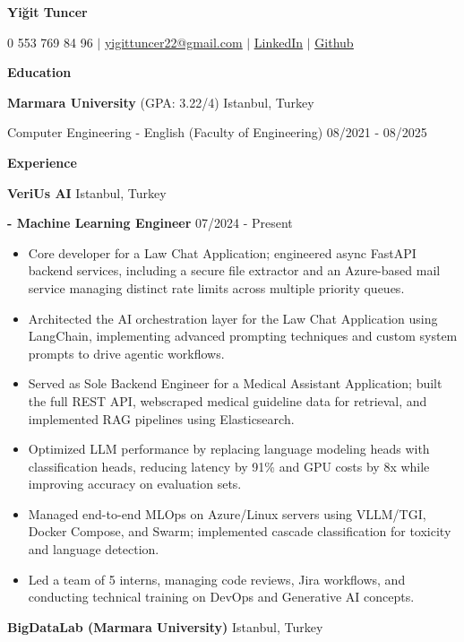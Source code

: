 \documentclass[paper=a4,fontsize=10.3pt]{scrartcl} %
\begin{document}
\begin{center}
    \textbf{\Huge Yiğit Tuncer} \\
    \hrulefill
\end{center}

\begin{center}
\vspace{0pt}
    0 553 769 84 96 $|$ \href{mailto:yigittuncer22@gmail.com}{\underline{yigittuncer22@gmail.com}} $|$
    \href{https://www.linkedin.com/in/yigittuncer03/}{\underline{LinkedIn}} $|$
    \href{https://github.com/yigittuncer07}{\underline{Github}} 
\end{center}


\begin{center}
    \textbf{Education}
    \hrulefill
\end{center}
\textbf{Marmara University} (GPA: 3.22/4) \hfill Istanbul, Turkey

Computer Engineering - English (Faculty of Engineering) \hfill 08/2021 - 08/2025

\begin{center}
    \textbf{Experience}
    \hrulefill
\end{center}
\textbf{VeriUs AI} \hfill Istanbul, Turkey

\textbf{- Machine Learning Engineer} \hfill 07/2024 - Present
\begin{itemize}[noitemsep]
    \item Core developer for a Law Chat Application; engineered async FastAPI backend services, including a secure file extractor and an Azure-based mail service managing distinct rate limits across multiple priority queues.
    \item Architected the AI orchestration layer for the Law Chat Application using LangChain, implementing advanced prompting techniques and custom system prompts to drive agentic workflows.
    \item Served as Sole Backend Engineer for a Medical Assistant Application; built the full REST API, webscraped medical guideline data for retrieval, and implemented RAG pipelines using Elasticsearch.
    \item Optimized LLM performance by replacing language modeling heads with classification heads, reducing latency by 91\% and GPU costs by 8x while improving accuracy on evaluation sets.
    \item Managed end-to-end MLOps on Azure/Linux servers using VLLM/TGI, Docker Compose, and Swarm; implemented cascade classification for toxicity and language detection.
    \item Led a team of 5 interns, managing code reviews, Jira workflows, and conducting technical training on DevOps and Generative AI concepts.
\end{itemize}
\textbf{BigDataLab (Marmara University)} \hfill Istanbul, Turkey
\end{document}
